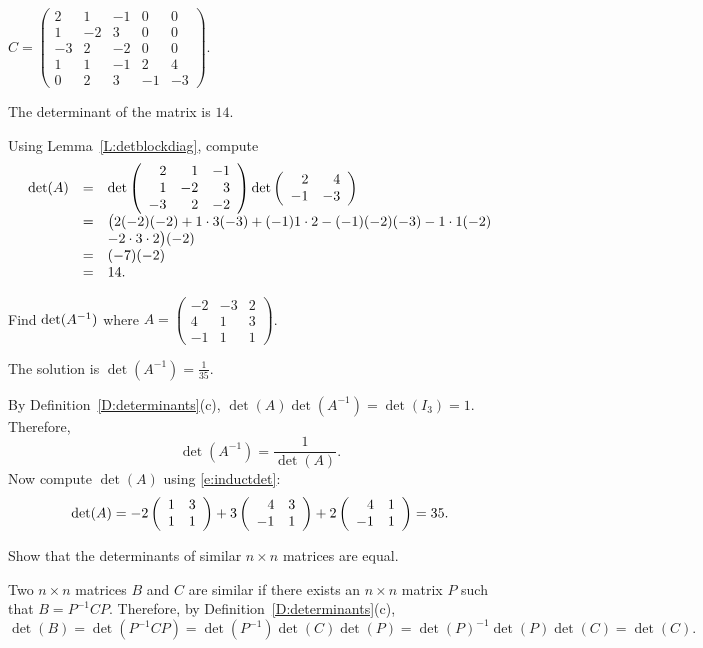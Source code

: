 \documentclass{ximera}
\begin{document}
\begin{exercise} \label{c10.1.1c}
$C = \left(\begin{array}{rrrrr} 2 & 1 & -1 & 0 & 0 \\ 1 & -2 & 3
& 0 & 0 \\ -3 & 2 & -2 & 0 & 0 \\ 1 & 1 & -1 & 2 & 4 \\ 0 & 2 &
3 & -1 & -3 \end{array} \right)$.

\begin{solution}

\ans The determinant of the matrix is $14$.

\soln Using Lemma~\ref{L:detblockdiag}, compute
\[ 
\begin{array}{rcl}
\det(A) & = & 
\det\left(\begin{array}{rrr} 2 & 1 & -1 \\ 1 & -2 & 3 \\ -3 & 2 & -2\end{array}\right)
\det\left(\begin{array}{rr} 2 & 4\\ -1 &-3\end{array}\right) \\
& = & \big(2(-2)(-2) + 1 \cdot 3(-3) + (-1)1 \cdot 2
- (-1)(-2)(-3) - 1 \cdot 1(-2) \\
& & - 2 \cdot 3 \cdot 2\big)
(-2) \\
& = & (-7)(-2) \\
& = & 14.
\end{array}
\]

\end{solution}
\end{exercise}

\begin{exercise} \label{c10.1.2}
Find $\det(A^{-1})$ where 
$A = \left(\begin{array}{rrr} -2 & -3 & 2 \\ 4 & 1 & 3 \\ -1 & 1 & 1
\end{array} \right)$. 

\begin{solution}

\ans The solution is $\det(A^{-1}) = \frac{1}{35}$.

\soln By Definition~\ref{D:determinants}(c),
$\det(A)\det(A^{-1}) = \det(I_3) = 1$.  Therefore,
\[
\det(A^{-1}) = \frac{1}{\det(A)}.
\]
Now compute $\det(A)$ using \eqref{e:inductdet}:
\[
\det(A) = -2\left(\begin{array}{rr} 1 & 3\\ 1 &1\end{array}\right) + 3\left(\begin{array}{rr} 4 & 3\\ -1 &1\end{array}\right)
+ 2\left(\begin{array}{rr} 4 & 1\\ -1 &1\end{array}\right) = 35.
\]

\end{solution}
\end{exercise}

\begin{exercise} \label{c10.1.3}
Show that the determinants of similar $n\times n$ matrices are
equal. 

\begin{solution}

Two $n \times n$ matrices $B$ and $C$ are similar if there exists
an $n \times n$ matrix $P$ such that $B = P^{-1}CP$.  Therefore, by
Definition~\ref{D:determinants}(c),
\[
\det(B) = \det(P^{-1}CP)
= \det(P^{-1})\det(C)\det(P)
= \det(P)^{-1}\det(P)\det(C)
= \det(C).
\]

\end{solution}
\end{exercise}
\end{document}
